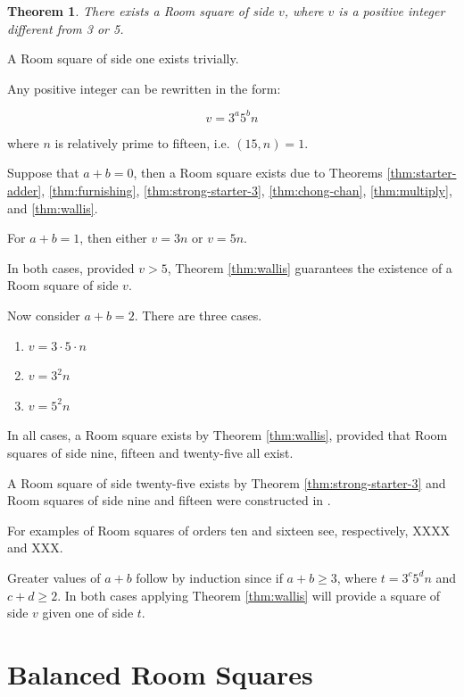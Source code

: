 \documentclass[
  11pt,
  a4paper]{book}
\newtheorem{theorem}{Theorem}
\newcounter{example}
\begin{document}
\begin{theorem}
There exists a Room square of side $v$, where $v$
is a positive integer different from 3 or 5.
\end{theorem}

A Room square of side one exists trivially.

Any positive integer can be rewritten in the form:

\begin{equation}
v = 3^{a}5^{b}n
\end{equation}

where \(n\) is relatively prime to fifteen, i.e. \((15, n) = 1\).

Suppose that \(a + b = 0\), then a Room square exists due to Theorems
\ref{thm:starter-adder}, \ref{thm:furnishing},
\ref{thm:strong-starter-3}, \ref{thm:chong-chan}, \ref{thm:multiply},
and \ref{thm:wallis}.

For \(a + b = 1\), then either \(v = 3n\) or \(v = 5n\).

In both cases, provided \(v > 5\), Theorem \ref{thm:wallis} guarantees
the existence of a Room square of side \(v\).

Now consider \(a + b = 2\). There are three cases.

\begin{enumerate}
  \item{$v = 3\cdot 5\cdot n$}
  \item{$v = 3^{2}n$}
  \item{$v = 5^{2}n$}
\end{enumerate}

In all cases, a Room square exists by Theorem \ref{thm:wallis}, provided
that Room squares of side nine, fifteen and twenty-five all exist.

A Room square of side twenty-five exists by Theorem
\ref{thm:strong-starter-3} and Room squares of side nine and fifteen
were constructed in \textcite{mullin_furnishing_1969}.

For examples of Room squares of orders ten and sixteen see,
respectively, XXXX and XXX.

Greater values of \(a + b\) follow by induction since if
\(a + b \geq 3\), where \(t = 3^{c}5^{d}n\) and \(c + d \geq 2\). In
both cases applying Theorem \ref{thm:wallis} will provide a square of
side \(v\) given one of side \(t\).

\hypertarget{balanced-room-squares}{%
\chapter{Balanced Room Squares}\label{balanced-room-squares}}
\end{document}
